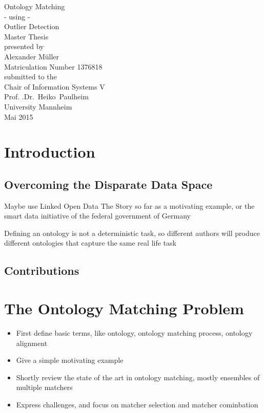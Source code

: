 \documentclass[11pt,titlepage,oneside,openany,a4paper]{report}
\begin{document}
\begin{titlepage}
	\vspace*{2cm}
  \begin{center}
   {\Large Ontology Matching \\}
   {\Large - using  -\\}
   {\Large Outlier Detection  \\}
   \vspace{2cm}
   {Master Thesis\\}
   \vspace{2cm}
   {presented by\\
 	 Alexander Müller \\
    Matriculation Number 1376818\\
   }
   \vspace{1cm}
   {submitted to the\\
  	Chair of Information Systems V\\
  	 Prof. .Dr.\ Heiko\ Paulheim \\
    University Mannheim\\} \vspace{2cm}
   {Mai 2015}
  \end{center}
\end{titlepage}
\tableofcontents
\newpage

\listoffigures

\listoftables

\newpage
{}
\chapter{Introduction}
	\section{Overcoming the Disparate Data Space}
	Maybe use Linked Open Data The Story so far as a motivating example, or the smart data initiative of the federal government of Germany
	
	Defining an ontology is not a deterministic task, so different authors will produce different ontologies that capture the same real life task
	\section{Contributions}

\chapter{The Ontology Matching Problem}
\label{chap:om_problem}
	\begin{itemize}
	\item First define basic terms, like ontology, ontology matching process, ontology alignment
	\item Give a simple motivating example
	\item Shortly review the state of the art in ontology matching, mostly ensembles of multiple matchers
	\item Express challenges, and focus on matcher selection and matcher cominbation
	\end{itemize}
\end{document}
